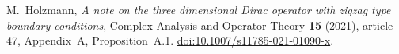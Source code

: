 M.~Holzmann, \emph{A note on the three dimensional Dirac operator with
zigzag type boundary conditions}, Complex Analysis and Operator Theory
\textbf{15} (2021), article 47, Appendix~A, Proposition~A.1.
\href{https://doi.org/10.1007/s11785-021-01090-x}{doi:10.1007/s11785-021-01090-x}.
